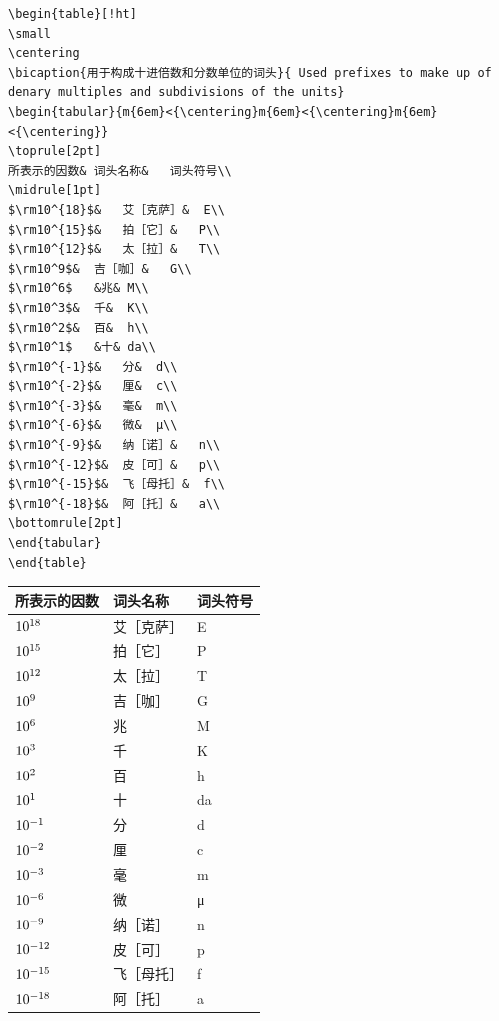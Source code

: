 \begin{lstlisting}[caption={表3.6绘制代码}]
\begin{table}[!ht]
\small
\centering
\bicaption{用于构成十进倍数和分数单位的词头}{ Used prefixes to make up of denary multiples and subdivisions of the units} 
\begin{tabular}{m{6em}<{\centering}m{6em}<{\centering}m{6em}<{\centering}}
\toprule[2pt]
所表示的因数&	词头名称&	词头符号\\
\midrule[1pt]
$\rm10^{18}$&	艾［克萨］&	E\\
$\rm10^{15}$&	拍［它］&	P\\
$\rm10^{12}$&	太［拉］&	T\\
$\rm10^9$&	吉［咖］&	G\\
$\rm10^6$	&兆&	M\\
$\rm10^3$&	千&	K\\
$\rm10^2$&	百&	h\\
$\rm10^1$	&十&	da\\
$\rm10^{-1}$&	分&	d\\
$\rm10^{-2}$&	厘&	c\\
$\rm10^{-3}$&	毫&	m\\
$\rm10^{-6}$&	微&	μ\\
$\rm10^{-9}$&	纳［诺］&	n\\
$\rm10^{-12}$&	皮［可］&	p\\
$\rm10^{-15}$&	飞［母托］&	f\\
$\rm10^{-18}$&	阿［托］&	a\\	
\bottomrule[2pt]
\end{tabular}
\end{table}
\end{lstlisting}
\begin{table}[!ht]
	\small
	\centering
	\begin{tabular}{m{6em}<{\centering}m{6em}<{\centering}m{6em}<{\centering}}
		\toprule[2pt]
		所表示的因数&	词头名称&	词头符号\\
		\midrule[1pt]
		$\rm10^{18}$&	艾［克萨］&	E\\
		$\rm10^{15}$&	拍［它］&	P\\
		$\rm10^{12}$&	太［拉］&	T\\
		$\rm10^9$&	吉［咖］&	G\\
		$\rm10^6$	&兆&	M\\
		$\rm10^3$&	千&	K\\
		$\rm10^2$&	百&	h\\
		$\rm10^1$	&十&	da\\
		$\rm10^{-1}$&	分&	d\\
		$\rm10^{-2}$&	厘&	c\\
		$\rm10^{-3}$&	毫&	m\\
		$\rm10^{-6}$&	微&	μ\\
		$\rm10^{-9}$&	纳［诺］&	n\\
		$\rm10^{-12}$&	皮［可］&	p\\
		$\rm10^{-15}$&	飞［母托］&	f\\
		$\rm10^{-18}$&	阿［托］&	a\\	
		\bottomrule[2pt]
	\end{tabular}
\end{table}
